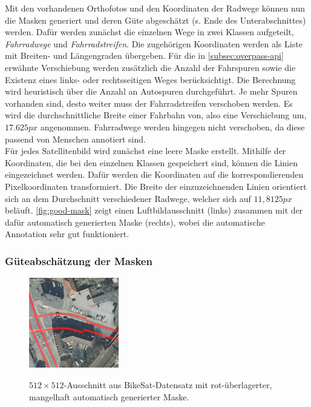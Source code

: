 Mit den vorhandenen Orthofotos und den Koordinaten der Radwege können nun die Masken generiert 
und deren Güte abgeschätzt (s. Ende des Unterabschnittes) werden.
Dafür werden zunächst die einzelnen Wege in zwei Klassen aufgeteilt, \textit{Fahrradwege} und \textit{Fahrradstreifen}.
Die zugehörigen Koordinaten werden als Liste mit Breiten- und Längengraden übergeben.
Für die in \autoref{subsec:overpass-api} erwähnte Verschiebung werden zusätzlich die Anzahl der Fahrspuren sowie die Existenz eines links- oder rechtsseitigen Weges berücksichtigt.
Die Berechnung wird heuristisch über die Anzahl an Autospuren durchgeführt.
Je mehr Spuren vorhanden sind, desto weiter muss der Fahrradstreifen verschoben werden.
Es wird die durchschnittliche Breite einer Fahrbahn von, also eine Verschiebung um, $17.625px$ angenommen.
Fahrradwege werden hingegen nicht verschoben, da diese passend von Menschen annotiert sind.\\
Für jedes Satellitenbild wird zunächst eine leere Maske erstellt.
Mithilfe der Koordinaten, die bei den einzelnen Klassen gespeichert sind, können die Linien eingezeichnet werden.
Dafür werden die Koordinaten auf die korrespondierenden Pixelkoordinaten transformiert.
Die Breite der einzuzeichnenden Linien orientiert sich an dem Durchschnitt verschiedener Radwege, welcher sich auf $11,8125px$ beläuft.
\autoref{fig:good-mask} zeigt einen Luftbildausschnitt (links) zusammen mit der dafür automatisch generierten Maske (rechts),
wobei die automatische Annotation sehr gut funktioniert. 

\subsubsection{Güteabschätzung der Masken}

\begin{figure}
	\centering
	\vspace{-30pt} %
	\includegraphics[width=0.35\textwidth]{Bilder/bad-mask-example.png}
	\vspace{-10pt}
	\caption[Schlechte Maske eines $512{\times}512$-Ausschnittes aus BikeSat-Datensatz.]{\unskip}
	$512{\times}512$-Ausschnitt aus BikeSat-Datensatz mit rot-überlagerter, mangelhaft automatisch generierter Maske.
	\label{fig:bad-mask}
\end{figure}

